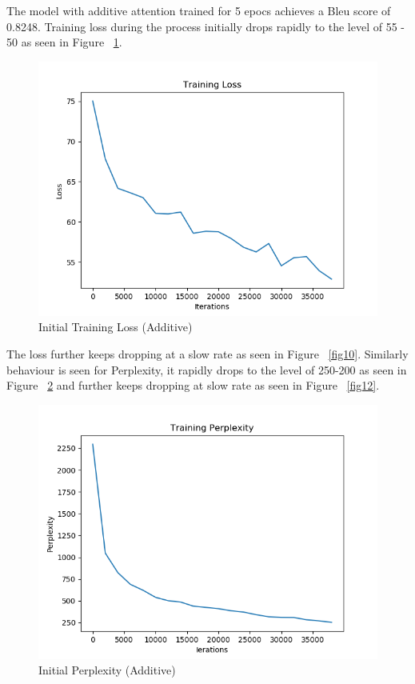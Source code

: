 \documentclass[11pt,a4paper]{article}
\begin{document}
The model with additive attention trained for 5 epocs achieves a Bleu score of 0.8248.
Training loss during the process initially drops rapidly to the level of 55 - 50 as seen in Figure ~\ref{fig9}. 
\begin{figure}[!htbp]
\includegraphics[width=\linewidth]{hi_add_loss_1.png}
\caption{Initial Training Loss (Additive)}
\label{fig9}
\end{figure}

The loss further keeps dropping at a slow rate as seen in Figure ~\ref{fig10}. Similarly behaviour is seen for Perplexity, it rapidly drops to the level of 250-200 as seen in Figure ~\ref{fig11} and further keeps dropping at slow rate as seen in Figure ~\ref{fig12}.


\begin{figure}[!htbp]
\includegraphics[width=\linewidth]{hi_add_ppl_1.png}
\caption{Initial Perplexity (Additive)}
\label{fig11}
\end{figure}
\end{document}
